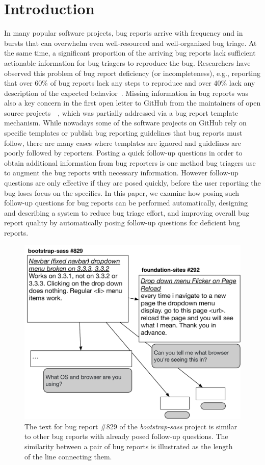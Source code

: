 \section{Introduction}

In many popular software projects, bug reports arrive with frequency and in bursts that can overwhelm even well-resourced and well-organized bug triage.
%
At the same time, a significant proportion of the arriving bug reports lack sufficient actionable information for bug triagers to reproduce the bug.
%
Researchers have observed this problem of bug report deficiency (or incompleteness), e.g., reporting that over 60\% of bug reports lack any steps to reproduce and over 40\% lack any description of the expected behavior~\cite{chaparro17detecting}.
%
Missing information in bug reports was also a key concern in the first open letter to GitHub from the maintainers of open source projects~\cite{deargithub}~\cite{breu2010information}, which was partially addressed via a bug report template mechanism.
%
While nowadays some of the software projects on GitHub rely on specific templates or publish bug reporting guidelines that bug reports must follow, there are many cases where templates are ignored and guidelines are poorly followed by reporters.
%
Posting a quick follow-up questions in order to obtain additional information from bug reporters is one method bug triagers use to augment the bug reports with necessary information.
%
However follow-up questions are only effective if they are posed quickly, before the user reporting the bug loses focus on the specifics.
%
In this paper, we examine how posing such follow-up questions for bug reports can be performed automatically, designing and describing a system to reduce bug triage effort, and improving overall bug report quality by automatically posing follow-up questions for deficient bug reports.

\begin{figure}[t]
\centering
\includegraphics[width=0.95\linewidth]{figures/br_motivation.pdf}
\caption{The text for bug report \#829 of the {\em bootstrap-sass} project is similar to other bug reports with already posed follow-up questions. The similarity between a pair of bug reports is illustrated as the length of the line connecting them.}
\label{fig:motivation}
\end{figure}

